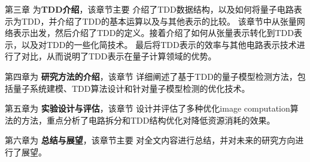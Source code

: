 第三章 为\textbf{TDD介绍}，该章节主要
介绍了TDD数据结构，以及如何将量子电路表示为TDD，并介绍了TDD的基本运算以及与其他表示的比较。
该章节中从张量网络表示出发，然后介绍了TDD的定义。接着介绍了如何从张量表示转化到TDD表示，以及对TDD的一些化简技术。
最后将TDD表示的效率与其他电路表示技术进行了对比，从而说明了TDD表示在量子计算领域的优势。

第四章为 \textbf{研究方法的介绍}，该章节
详细阐述了基于TDD的量子模型检测方法，包括量子系统建模、TDD算法设计和针对量子模型检测的优化技术。


第五章为 \textbf{实验设计与评估}，该章节
设计并评估了多种优化image computation算法的方法，重点分析了电路拆分和TDD结构优化对降低资源消耗的效果。

第六章为 \textbf{总结与展望}，该章节主要
对全文内容进行总结，并对未来的研究方向进行了展望。